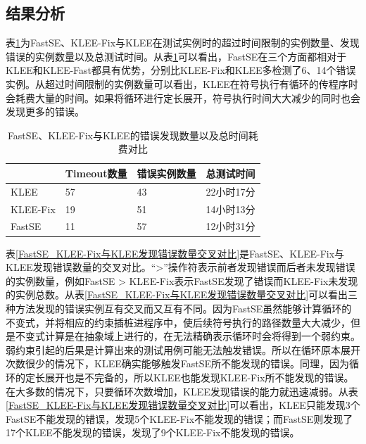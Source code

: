 \subsection{结果分析}
表\ref{FastSE_KLEE-Fix与KLEE的发现错误数量以及总时间耗费对比}为FastSE、KLEE-Fix与KLEE在测试实例时的超过时间限制的实例数量、发现错误的实例数量以及总测试时间。从表\ref{FastSE_KLEE-Fix与KLEE的发现错误数量以及总时间耗费对比}可以看出，FastSE在三个方面都相对于KLEE和KLEE-Fast都具有优势，分别比KLEE-Fix和KLEE多检测了6、14个错误实例。从超过时间限制的实例数量可以看出，KLEE在符号执行有循环的传程序时会耗费大量的时间。如果将循环进行定长展开，符号执行时间大大减少的同时也会发现更多的错误。

\begin{table}[ht]
\begin{center}
\caption{FastSE、KLEE-Fix与KLEE的错误发现数量以及总时间耗费对比}
\label{FastSE_KLEE-Fix与KLEE的发现错误数量以及总时间耗费对比}
\begin{small}
\begin{tabular}{|l|l|l|l|}
\hline
{\bf } & {\bf Timeout数量} & {\bf 错误实例数量} & {\bf 总测试时间} \\
\hline
KLEE & 57 & 43 & 22小时17分 \\
KLEE-Fix & 19 & 51 & 14小时13分 \\
FastSE & 11 & 57 & 12小时31分\\
\hline
\end{tabular}
\end{small}
\end{center}
\end{table}

表\ref{FastSE_KLEE-Fix与KLEE发现错误数量交叉对比}是FastSE、KLEE-Fix与KLEE发现错误数量的交叉对比。“>”操作符表示前者发现错误而后者未发现错误的实例数量，例如FastSE > KLEE-Fix表示FastSE发现了错误而KLEE-Fix未发现的实例总数。从表\ref{FastSE_KLEE-Fix与KLEE发现错误数量交叉对比}可以看出三种方法发现的错误实例互有交叉而又互有不同。因为FastSE虽然能够计算循环的不变式，并将相应的约束插桩进程序中，使后续符号执行的路径数量大大减少，但是不变式计算是在抽象域上进行的，在无法精确表示循环时会将得到一个弱约束。弱约束引起的后果是计算出来的测试用例可能无法触发错误。所以在循环原本展开次数很少的情况下，KLEE确实能够触发FastSE所不能发现的错误。同理，因为循环的定长展开也是不完备的，所以KLEE也能发现KLEE-Fix所不能发现的错误。在大多数的情况下，只要循环次数增加，KLEE发现错误的能力就迅速减弱。从表\ref{FastSE_KLEE-Fix与KLEE发现错误数量交叉对比}可以看出，KLEE只能发现3个FastSE不能发现的错误，发现5个KLEE-Fix不能发现的错误；而FastSE则发现了17个KLEE不能发现的错误，发现了9个KLEE-Fix不能发现的错误。

